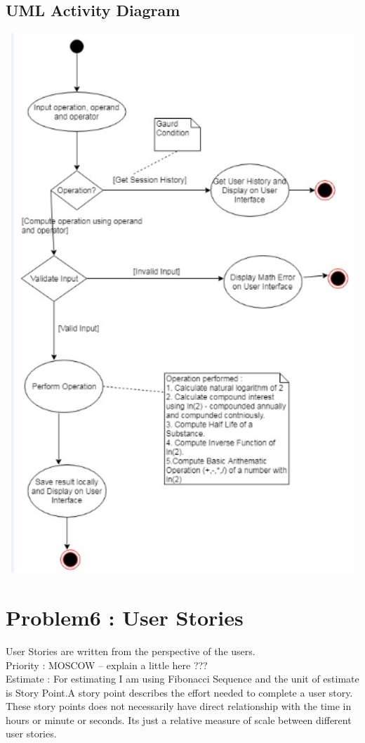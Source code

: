 \documentclass[12pt]{article}
\begin{document}
\subsection{UML Activity Diagram}
\includegraphics[width=6.5in,height=8in]{./Problem5_UML_Activity.png}
\section{Problem6 : User Stories}
User Stories are written from the perspective of the users.\\
Priority : MOSCOW -- explain a little here ???\\
Estimate : For estimating I am using Fibonacci Sequence and the unit of estimate is Story Point.A story point describes the effort needed to complete a user story.
These story points does not necessarily have direct relationship with the time in hours or minute or seconds.
Its just a relative measure of scale between different user stories.
\end{document}
